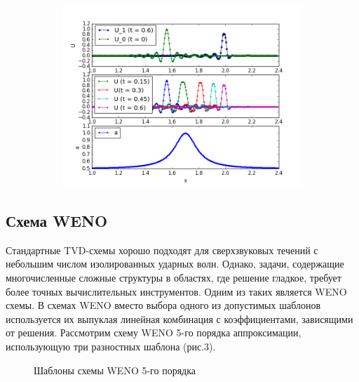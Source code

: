 \documentclass{article}
\begin{document}
\begin{figure}[h]
\begin{subfigure}{0.33\textwidth}
    \includegraphics[width=1\linewidth]{TVD_tests/lim_MC_a_hat_U0_peack.png}
    \end{subfigure}
\end{figure}


\subsection{Схема WENO}

Стандартные TVD-схемы хорошо подходят для сверхзвуковых течений с небольшим числом изолированных ударных волн. Однако, задачи, содержащие многочисленные сложные структуры в областях, где решение гладкое, требует более точных вычислительных инструментов. Одним из таких является WENO схемы. В схемах WENO вместо выбора одного из допустимых шаблонов используется их выпуклая линейная комбинация с коэффициентами,
зависящими от решения.
Рассмотрим схему WENO 5-го порядка аппроксимации, использующую три
разностных шаблона (рис.3).
\begin{figure}[h]
\caption{Шаблоны схемы WENO 5-го порядка}
\label{ris:image}
\end{figure}
\end{document}
